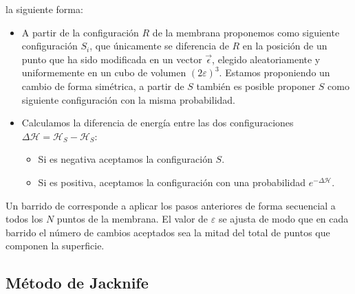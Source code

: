  la siguiente forma:
\begin{itemize}
\item A partir de la configuración $R$ de la membrana proponemos como
  siguiente configuración $S_i$, que únicamente se diferencia de $R$ en la
  posición de un punto que ha sido modificada en un vector $\vec{\epsilon}$,
  elegido aleatoriamente y uniformemente en un cubo de volumen 
  $(2\varepsilon)^3$. Estamos proponiendo un cambio de forma simétrica, a
  partir de $S$ también es posible proponer $S$ como siguiente configuración
  con la misma probabilidad.
\item Calculamos la diferencia de energía entre las dos configuraciones
  $\Delta\mathcal{H}=\mathcal{H}_S-\mathcal{H}_S$:
  \begin{itemize}
    \item Si es negativa aceptamos la configuración $S$.
    \item Si es positiva, aceptamos la configuración con una probabilidad $e^{-\Delta\mathcal{H}}$.
  \end{itemize}
\end{itemize}

Un barrido de corresponde a aplicar los pasos anteriores de forma secuencial a
todos los $N$ puntos de la membrana. El valor de $\varepsilon$ se ajusta de
modo que en cada barrido el número de cambios aceptados sea la mitad del total
de puntos que componen la superficie. 
 
\subsection{Método de Jacknife}

